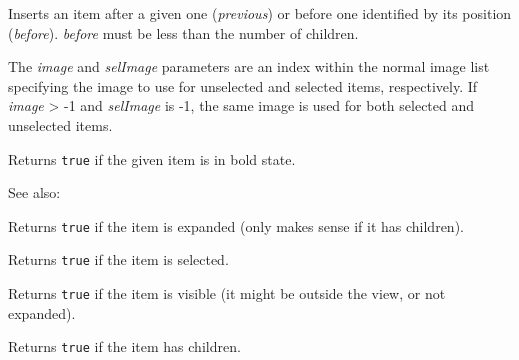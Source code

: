 
Inserts an item after a given one ({\it previous}) or before one identified by its position ({\it before}).
{\it before} must be less than the number of children.

The {\it image} and {\it selImage} parameters are an index within
the normal image list specifying the image to use for unselected and
selected items, respectively.
If {\it image} > -1 and {\it selImage} is -1, the same image is used for
both selected and unselected items.



\label{wxtreectrlisbold}


Returns {\tt true} if the given item is in bold state.

See also: 


\label{wxtreectrlisexpanded}


Returns {\tt true} if the item is expanded (only makes sense if it has children).


\label{wxtreectrlisselected}


Returns {\tt true} if the item is selected.


\label{wxtreectrlisvisible}


Returns {\tt true} if the item is visible (it might be outside the view, or not expanded).


\label{wxtreectrlitemhaschildren}


Returns {\tt true} if the item has children.


